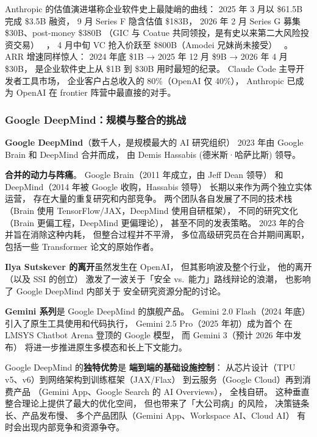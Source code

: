 Anthropic 的估值演进堪称企业软件史上最陡峭的曲线：
2025 年 3 月以 \$61.5B 完成 \$3.5B 融资，
9 月 Series F 隐含估值 \$183B，
2026 年 2 月 Series G 募集 \$30B、post-money \$380B
（GIC 与 Coatue 共同领投，是有史以来第二大风险投资交易）%
~\cite{anthropic_seriesg_2026}，
4 月中旬 VC 抢入价跃至 \$800B（Amodei 兄妹尚未接受）%
~\cite{anthropic_800b_valuation_2026}。
ARR 增速同样惊人：
2024 年底 \$1B → 2025 年 12 月 \$9B → 2026 年 4 月 \$30B，
是企业软件史上从 \$1B 到 \$30B 用时最短的纪录。
Claude Code 主导开发者工具市场，
企业客户占总收入的 80\%（OpenAI 仅 40\%），
Anthropic 已成为 OpenAI 在 frontier 阵营中最直接的对手。

\subsubsection{Google DeepMind：规模与整合的挑战}

\textbf{Google DeepMind}（数千人，是规模最大的 AI 研究组织）
2023 年由 Google Brain 和 DeepMind 合并而成，
由 Demis Hassabis (德米斯·哈萨比斯) 领导。

\textbf{合并的动力与阵痛}。
Google Brain（2011 年成立，由 Jeff Dean 领导）
和 DeepMind（2014 年被 Google 收购，Hassabis 领导）
长期以来作为两个独立实体运营，
存在大量的重复研究和内部竞争。
两个团队各自发展了不同的技术栈
（Brain 使用 TensorFlow/JAX，DeepMind 使用自研框架），
不同的研究文化
（Brain 更偏工程，DeepMind 更偏理论），
甚至不同的发表策略。
2023 年的合并旨在消除这种内耗，
但整合过程并不平滑，
多位高级研究员在合并期间离职，
包括一些 Transformer 论文的原始作者。

\textbf{Ilya Sutskever 的离开}虽然发生在 OpenAI，
但其影响波及整个行业，
他的离开（以及 SSI 的创立）
激发了一波关于「安全 vs.\ 能力」路线辩论的浪潮，
也影响了 Google DeepMind 内部关于
安全研究资源分配的讨论。

\textbf{Gemini 系列}是 Google DeepMind 的旗舰产品。
Gemini 2.0 Flash（2024 年底）引入了原生工具使用和代码执行，
Gemini 2.5 Pro（2025 年初）成为首个
在 LMSYS Chatbot Arena 登顶的 Google 模型，
而 Gemini 3（预计 2026 年中发布）
将进一步推进原生多模态和长上下文能力。

Google DeepMind 的\textbf{独特优势}是
\textbf{端到端的基础设施控制}：
从芯片设计（TPU v5、v6）到网络架构到训练框架（JAX/Flax）
到云服务（Google Cloud）再到消费产品
（Gemini App、Google Search 的 AI Overviews），
全栈自研。
这种垂直整合理论上提供了最大的优化空间，
但也带来了「大公司病」的风险，
决策链条长、产品发布慢、
多个产品团队（Gemini App、Workspace AI、Cloud AI）
有时会出现内部竞争和资源争夺。

